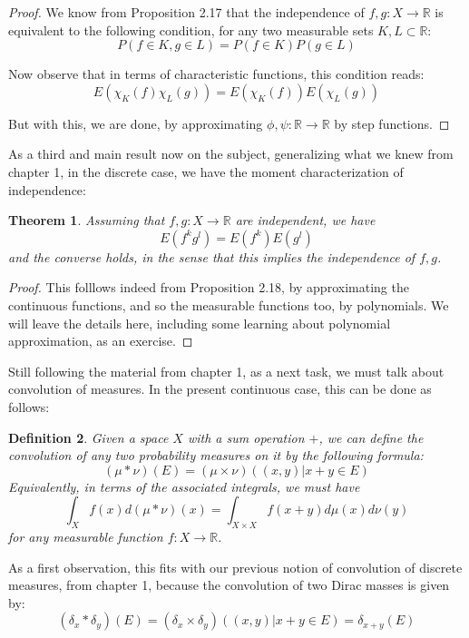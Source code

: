 \documentclass[12pt]{amsbook}
\newtheorem{theorem}{Theorem}[chapter]
\newtheorem{definition}[theorem]{Definition}
\begin{document}
\begin{proof}
We know from Proposition 2.17 that the independence of $f,g:X\to\mathbb R$ is equivalent to the following condition, for any two measurable sets $K,L\subset\mathbb R$:
$$P(f\in K,g\in L)=P(f\in K)P(g\in L)$$

Now observe that in terms of characteristic functions, this condition reads:
$$E(\chi_K(f)\chi_L(g))=E(\chi_K(f))E(\chi_L(g))$$

But with this, we are done, by approximating $\phi,\psi:\mathbb R\to\mathbb R$ by step functions.
\end{proof}

As a third and main result now on the subject, generalizing what we knew from chapter 1, in the discrete case, we have the moment characterization of independence:


\begin{theorem}
Assuming that $f,g:X\to\mathbb R$ are independent, we have
$$E(f^kg^l)=E(f^k)E(g^l)$$
and the converse holds, in the sense that this implies the independence of $f,g$.
\end{theorem}

\begin{proof}
This folllows indeed from Proposition 2.18, by approximating the continuous functions, and so the measurable functions too, by polynomials. We will leave the details here, including some learning about polynomial approximation, as an exercise. 
\end{proof}

Still following the material from chapter 1, as a next task, we must talk about convolution of measures. In the present continuous case, this can be done as follows:


\begin{definition}
Given a space $X$ with a sum operation $+$, we can define the convolution of any two probability measures on it by the following formula:
$$(\mu*\nu)(E)=(\mu\times\nu)\left((x,y)\Big|x+y\in E\right)$$
Equivalently, in terms of the associated integrals, we must have 
$$\int_Xf(x)d(\mu*\nu)(x)=\int_{X\times X}f(x+y)d\mu(x)d\nu(y)$$
for any measurable function $f:X\to\mathbb R$.
\end{definition}

As a first observation, this fits with our previous notion of convolution of discrete measures, from chapter 1, because the convolution of two Dirac masses is given by:
$$(\delta_x*\delta_y)(E)=(\delta_x\times\delta_y)\left((x,y)\Big|x+y\in E\right)=\delta_{x+y}(E)$$
\end{document}
